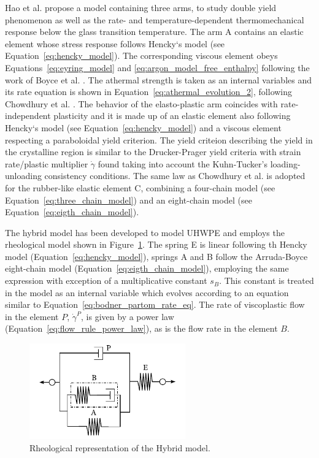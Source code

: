 Hao et al. \citep{haoRatedependentConstitutiveModel2022} propose a model containing three arms, to study double yield phenomenon as well as the rate- and temperature-dependent thermomechanical response below the glass transition temperature.
The arm A contains an elastic element whose stress response follows Hencky`s model (see Equation~\eqref{eq:hencky_model}).
The corresponding viscous element obeys Equations~\eqref{eq:eyring_model} and \eqref{eq:argon_model_free_enthalpy} following the work of Boyce et al. \citep{boyceLargeInelasticDeformation1988}.
The athermal strength is taken as an internal variables and its rate equation is shown in Equation~\eqref{eq:athermal_evolution_2}, following Chowdhury et al. \citep{chowdhuryEffectsManufacturingInducedVoids2008}.
The behavior of the elasto-plastic arm coincides with rate-independent plasticity and it is made up of an elastic element also following Hencky`s model (see Equation~\eqref{eq:hencky_model}) and a viscous element respecting a paraboloidal yield criterion.
The yield criteion describing the yield in the crystalline region is similar to the Drucker-Prager yield criteria with strain rate/plastic multiplier $\dot \gamma$ found taking into account the Kuhn-Tucker's loading-unloading consistency conditions.
The same law as Chowdhury et al. is adopted for the rubber-like elastic element C, combining a  four-chain model (see Equation~\eqref{eq:three_chain_model}) and an eight-chain model (see Equation~\eqref{eq:eigth_chain_model}).

The hybrid model has been developed to model UHWPE \citep{bergstromConstitutiveModelingUltrahigh2002, bergstromPredictionMultiaxialMechanical2003} and employs the rheological model shown in Figure~\ref{fig:hybrid_model}.
The spring E is linear following th Hencky model (Equation~\eqref{eq:hencky_model}), springs A and B follow the Arruda-Boyce eight-chain model (Equation~\eqref{eq:eigth_chain_model}), employing the same expression with exception of a multiplicative constant $s_B$.
This constant is treated in the model as an internal variable which evolves according to an equation similar to Equation~\eqref{eq:bodner_partom_rate_eq}.
The rate of viscoplastic flow in the element $P$, $\dot\gamma^P$, is given by a power law (Equation~\eqref{eq:flow_rule_power_law}), as is the flow rate in the element $B$.
\begin{figure}[hbtp]
	\includegraphics[width=0.6\textwidth]{figures/hybrid_model}
	\caption{Rheological representation of the Hybrid model.}
\label{fig:hybrid_model}
\end{figure}

